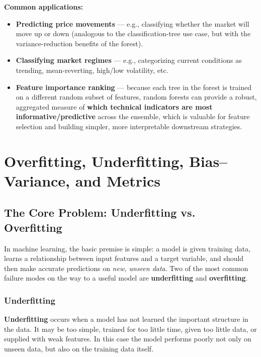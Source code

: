 \documentclass[12pt,openany]{book}
\begin{document}
\textbf{Common applications:}
\begin{itemize}[leftmargin=*]
    \item \textbf{Predicting price movements} --- e.g., classifying whether the market will move up or down (analogous to the classification-tree use case, but with the variance-reduction benefits of the forest).
    \item \textbf{Classifying market regimes} --- e.g., categorizing current conditions as trending, mean-reverting, high/low volatility, etc.
    \item \textbf{Feature importance ranking} --- because each tree in the forest is trained on a different random subset of features, random forests can provide a robust, aggregated measure of \textbf{which technical indicators are most informative/predictive} across the ensemble, which is valuable for feature selection and building simpler, more interpretable downstream strategies.
\end{itemize}


\section{Overfitting, Underfitting, Bias--Variance, and Metrics}

\subsection{The Core Problem: Underfitting vs. Overfitting}

In machine learning, the basic premise is simple: a model is given training data, learns a relationship between input features and a target variable, and should then make accurate predictions on \textit{new, unseen data}. Two of the most common failure modes on the way to a useful model are \textbf{underfitting} and \textbf{overfitting}.

\subsubsection{Underfitting}

\textbf{Underfitting} occurs when a model has not learned the important structure in the data. It may be too simple, trained for too little time, given too little data, or supplied with weak features. In this case the model performs poorly not only on unseen data, but also on the training data itself.
\end{document}
